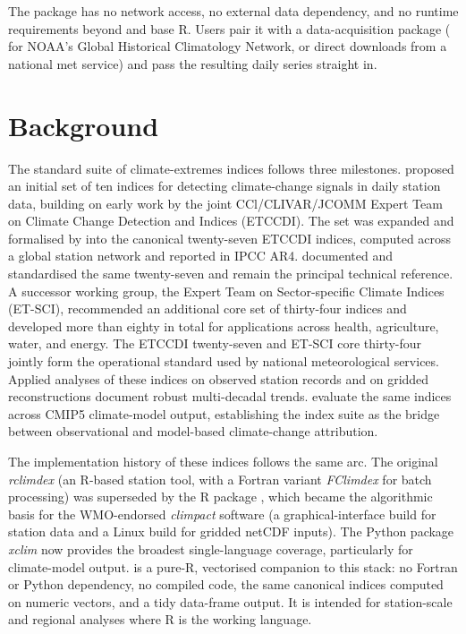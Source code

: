 The package has no network access, no external data dependency,
and no runtime requirements beyond  and base R. Users
pair it with a data-acquisition package ( for
NOAA's Global Historical Climatology Network, or direct downloads
from a national met service) and pass the resulting daily series
straight in.

\section{Background}\label{background}

The standard suite of climate-extremes indices follows three
milestones. \citet{frich2002observed} proposed an initial set of ten
indices for detecting climate-change signals in daily station
data, building on early work by the joint CCl/CLIVAR/JCOMM Expert
Team on Climate Change Detection and Indices (ETCCDI). The set was
expanded and formalised by \citet{alexander2006global} into the canonical
twenty-seven ETCCDI indices, computed across a global station
network and reported in IPCC AR4. \citet{zhang2011indices} documented and
standardised the same twenty-seven and remain the principal
technical reference. A successor working group, the Expert Team on
Sector-specific Climate Indices (ET-SCI), recommended an
additional core set of thirty-four indices and developed more than
eighty in total for applications across health, agriculture,
water, and energy. The ETCCDI twenty-seven and ET-SCI core
thirty-four jointly form the operational standard used by national
meteorological services. Applied analyses of these indices on
observed station records \citep{alexander2006global} and on gridded
reconstructions \citep{donat2013hadex} document robust multi-decadal
trends. \citet{sillmann2013indices} evaluate the same indices across
CMIP5 climate-model output, establishing the index suite as the
bridge between observational and model-based climate-change
attribution.

The implementation history of these indices follows the same arc.
The original \emph{rclimdex} (an R-based station tool, with a
Fortran variant \emph{FClimdex} for batch processing) was
superseded by the R package , which became the
algorithmic basis for the WMO-endorsed \emph{climpact} software (a
graphical-interface build for station data and a Linux build for
gridded netCDF inputs). The Python package \emph{xclim} now
provides the broadest single-language coverage, particularly for
climate-model output.  is a pure-R, vectorised
companion to this stack: no Fortran or Python dependency, no
compiled code, the same canonical indices computed on numeric
vectors, and a tidy data-frame output. It is intended for
station-scale and regional analyses where R is the working
language.

